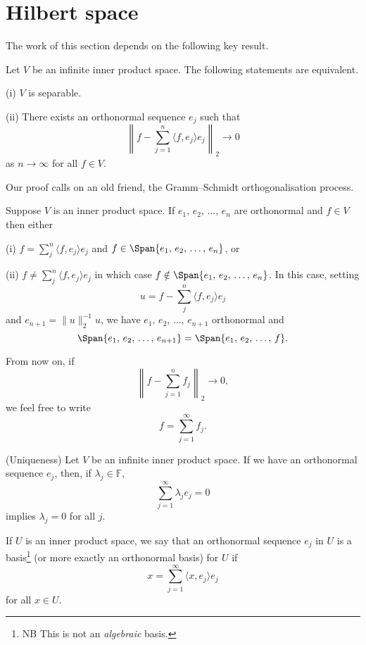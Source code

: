 \section{Hilbert space}  The work of this section depends 
on the following key result.
\begin{theorem} Let $V$ be an infinite inner product space. The
following statements are equivalent.

(i) $V$ is separable.

(ii) There exists an orthonormal sequence $e_{j}$
such that
\[\left\|f-\sum_{j=1}^{n}\langle f,e_{j}\rangle e_{j}\right\|_{2}
\rightarrow 0\]
as $n\rightarrow\infty$ for all $f\in V$.
\end{theorem}
Our proof calls on an old friend, the Gramm--Schmidt
orthogonalisation process.
\begin{exercise} Suppose $V$ is an inner product space.
If $e_{1},\,e_{2},\,\dots,\,e_{n}$ are orthonormal
and $f\in V$ then either

(i) $f=\sum_{j}^{n}\langle f,e_{j}\rangle e_{j}$
and $f\in\Span\{e_{1},\,e_{2},\,\dots,\,e_{n}\}$, or

(ii) $f\neq\sum_{j}^{n}\langle f,e_{j}\rangle e_{j}$
in which case $f\notin \Span\{e_{1},\,e_{2},\,\dots,\,e_{n}\}$.
In this case, setting
\[u=f-\sum_{j}^{n}\langle f,e_{j}\rangle e_{j}\]
and $e_{n+1}=\|u\|_{2}^{-1}u$, we have
$e_{1},\,e_{2},\,\dots,\,e_{n+1}$ orthonormal and
\[\Span\{e_{1},\,e_{2},\,\dots,\,e_{n+1}\}
=\Span\{e_{1},\,e_{2},\,\dots,\,f\}.\]
\end{exercise}
From now on, if
\[\left\|f-\sum_{j=1}^{n} f_{j}\right\|_{2}
\rightarrow 0,\]
we feel free to write
\[f=\sum_{j=1}^{\infty} f_{j}.\] 
\begin{exercise} (Uniqueness)
Let $V$ be an infinite inner product space. If
we have an orthonormal sequence $e_{j}$, then,
if $\lambda_{j}\in{\mathbb F}$,
\[\sum_{j=1}^{\infty}\lambda_{j}e_{j}=0\]
implies $\lambda_{j}=0$ for all $j$.

\end{exercise}
\begin{definition} If $U$ is an inner product space,
we say that an orthonormal sequence $e_{j}$ in $U$ is a 
basis\footnote{NB This is not an \emph{algebraic} basis.}
(or more exactly an orthonormal basis)
for $U$ if 
\[x= \sum_{j=1}^{\infty}\langle x,e_{j}\rangle e_{j}\]
for all $x\in U$. 
\end{definition}

